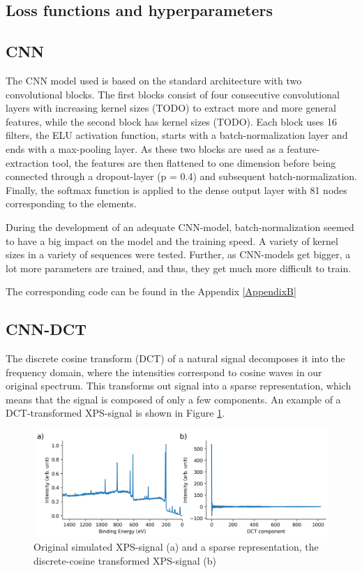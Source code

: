 \subsection{Loss functions and hyperparameters}



\subsection{CNN}
The CNN model used is based on the standard architecture with two convolutional blocks. The first blocks consist of four consecutive convolutional layers with increasing kernel sizes (TODO) to extract more and more general features, while the second block has kernel sizes (TODO). Each block uses 16 filters, the ELU activation function, starts with a batch-normalization layer and ends with a max-pooling layer.
As these two blocks are used as a feature-extraction tool, the features are then flattened to one dimension before being connected through a dropout-layer (p = 0.4) and subsequent batch-normalization. Finally, the softmax function is applied to the dense output layer with 81 nodes corresponding to the elements.

During the development of an adequate CNN-model, batch-normalization seemed to have a big impact on the model and the training speed. A variety of kernel sizes in a variety of sequences were tested. Further, as CNN-models get bigger, a lot more parameters are trained, and thus, they get much more difficult to train.

The corresponding code can be found in the Appendix \ref{AppendixB}


\subsection{CNN-DCT}
The discrete cosine transform (DCT) of a natural signal decomposes it into the frequency domain, where the intensities correspond to cosine waves in our original spectrum. This transforms out signal into a sparse representation, which means that the signal is composed of only a few components. An example of a DCT-transformed XPS-signal is shown in Figure \ref{fig:dct}.

\begin{figure}[H]
    \centering
    \includegraphics[width=\textwidth]{Figures/dct.png}
    \caption{Original simulated XPS-signal (a) and a sparse representation, the discrete-cosine transformed XPS-signal (b)}
    \label{fig:dct}
\end{figure}

